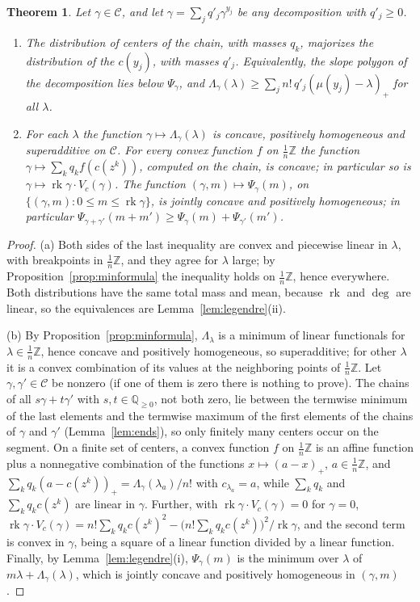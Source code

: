 \documentclass[11pt]{amsart}
\newtheorem{theorem}{Theorem}[section]
\theoremstyle{definition}
\theoremstyle{remark}
\newcommand{\QQ}{\mathbb{Q}}
\newcommand{\ZZ}{\mathbb{Z}}
\newcommand{\CC}{\mathcal{C}}
\DeclareMathOperator{\rk}{rk}
\begin{document}
\begin{theorem}\label{thm:concave}
Let $\gamma\in\CC$, and let $\gamma=\sum_jq'_j\gamma^{y_j}$ be any decomposition with $q'_j\ge0$.
\begin{enumerate}[label=\textup{(\alph*)}]
\item The distribution of centers of the chain, with masses $q_k$, majorizes the distribution of the $c(y_j)$, with masses $q'_j$. Equivalently, the slope polygon of the decomposition lies below $\Psi_\gamma$, and $\Lambda_\gamma(\lambda)\ge\sum_jn!\,q'_j(\mu(y_j)-\lambda)_+$ for all $\lambda$.
\item For each $\lambda$ the function $\gamma\mapsto\Lambda_\gamma(\lambda)$ is concave, positively homogeneous and superadditive on $\CC$. For every convex function $f$ on $\frac1n\ZZ$ the function $\gamma\mapsto\sum_kq_kf(c(z^k))$, computed on the chain, is concave; in particular so is $\gamma\mapsto\rk\gamma\cdot V_c(\gamma)$. The function $(\gamma,m)\mapsto\Psi_\gamma(m)$, on $\{(\gamma,m):0\le m\le\rk\gamma\}$, is jointly concave and positively homogeneous; in particular $\Psi_{\gamma+\gamma'}(m+m')\ge\Psi_\gamma(m)+\Psi_{\gamma'}(m')$.
\end{enumerate}
\end{theorem}

\begin{proof}
(a) Both sides of the last inequality are convex and piecewise linear in $\lambda$, with breakpoints in $\frac1n\ZZ$, and they agree for $\lambda$ large; by Proposition~\ref{prop:minformula} the inequality holds on $\frac1n\ZZ$, hence everywhere. Both distributions have the same total mass and mean, because $\rk$ and $\deg$ are linear, so the equivalences are Lemma~\ref{lem:legendre}(ii).

(b) By Proposition~\ref{prop:minformula}, $\Lambda_\lambda$ is a minimum of linear functionals for $\lambda\in\frac1n\ZZ$, hence concave and positively homogeneous, so superadditive; for other $\lambda$ it is a convex combination of its values at the neighboring points of $\frac1n\ZZ$. Let $\gamma,\gamma'\in\CC$ be nonzero (if one of them is zero there is nothing to prove). The chains of all $s\gamma+t\gamma'$ with $s,t\in\QQ_{\ge0}$, not both zero, lie between the termwise minimum of the last elements and the termwise maximum of the first elements of the chains of $\gamma$ and $\gamma'$ (Lemma~\ref{lem:ends}), so only finitely many centers occur on the segment. On a finite set of centers, a convex function $f$ on $\frac1n\ZZ$ is an affine function plus a nonnegative combination of the functions $x\mapsto(a-x)_+$, $a\in\frac1n\ZZ$, and $\sum_kq_k(a-c(z^k))_+=\Lambda_\gamma(\lambda_a)/n!$ with $c_{\lambda_a}=a$, while $\sum_kq_k$ and $\sum_kq_kc(z^k)$ are linear in $\gamma$. Further, with $\rk\gamma\cdot V_c(\gamma)=0$ for $\gamma=0$, $\rk\gamma\cdot V_c(\gamma)=n!\sum_kq_kc(z^k)^2-\big(n!\sum_kq_kc(z^k)\big)^2/\rk\gamma$, and the second term is convex in $\gamma$, being a square of a linear function divided by a linear function. Finally, by Lemma~\ref{lem:legendre}(i), $\Psi_\gamma(m)$ is the minimum over $\lambda$ of $m\lambda+\Lambda_\gamma(\lambda)$, which is jointly concave and positively homogeneous in $(\gamma,m)$.
\end{proof}
\end{document}
